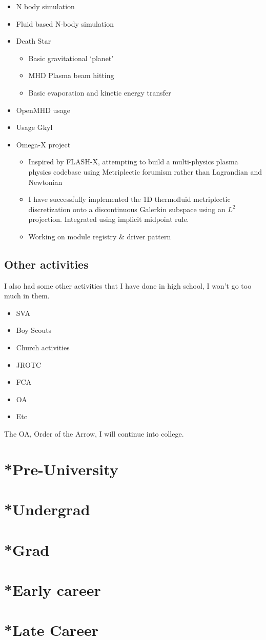 \begin{itemize}
    \item N body simulation 
    \item Fluid based N-body simulation
    \item Death Star
    \begin{itemize}
        \item Basic gravitational ‘planet’
        \item MHD Plasma beam hitting
        \item Basic evaporation and kinetic energy transfer
    \end{itemize}
    \item OpenMHD usage
    \item Usage Gkyl
    \item Omega-X project
    \begin{itemize}
        \item Inspired by FLASH-X, attempting to build a multi-physics plasma physics codebase using Metriplectic forumism rather than Lagrandian and Newtonian
        \item I have successfully implemented the 1D thermofluid metriplectic discretization onto a discontinuous Galerkin subspace using an $L^2$ projection. Integrated using implicit midpoint rule.
        \item Working on module registry \& driver pattern
    \end{itemize}
\end{itemize}
\subsection{Other activities}
I also had some other activities that I have done in high school, I won't go too much in them. 
\begin{itemize}
    \item SVA
    \item Boy Scouts
    \item Church activities
    \item JROTC
    \item FCA
    \item OA
    \item Etc
\end{itemize}
The OA, Order of the Arrow, I will continue into college.
\section{*Pre-University}

\section{*Undergrad}

\section{*Grad}

\section{*Early career}

\section{*Late Career}
